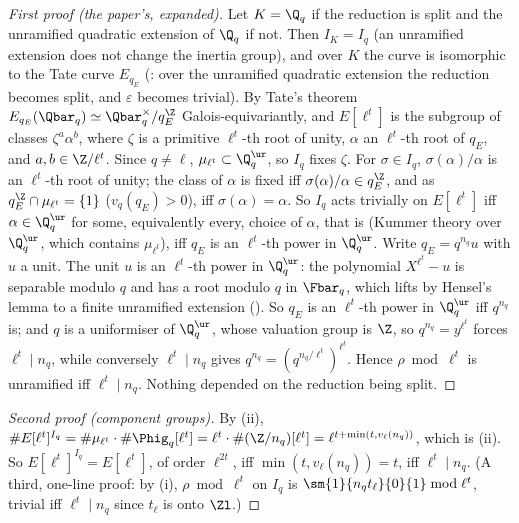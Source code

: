 \begin{proof}[First proof (the paper's, expanded)]
Let $K=\Q_q$ if the reduction is split and the unramified quadratic extension of $\Q_q$ if not. Then $I_K=I_q$ (an unramified extension does not change
the inertia group), and over $K$ the curve is isomorphic to the Tate curve $E_{q_E}$ (: over the unramified quadratic extension
the reduction becomes split, and $\varepsilon$ becomes trivial). By Tate's theorem $E_{q_E}(\Qbar_q)\simeq\Qbar_q^\times/q_E^{\Z}$ Galois-equivariantly, and
$E[\ell^t]$ is the subgroup of classes $\zeta^a\alpha^b$, where $\zeta$ is a primitive $\ell^t$-th root of unity, $\alpha$ an $\ell^t$-th root of $q_E$, and
$a,b\in\Z/\ell^t$. Since $q\ne\ell$, $\mu_{\ell^t}\subset\Q_q^{\ur}$, so $I_q$ fixes $\zeta$. For $\sigma\in I_q$, $\sigma(\alpha)/\alpha$ is an $\ell^t$-th root of unity; the class
of $\alpha$ is fixed iff $\sigma(\alpha)/\alpha\in q_E^{\Z}$, and as $q_E^{\Z}\cap\mu_{\ell^t}=\{1\}$ ($v_q(q_E)>0$), iff $\sigma(\alpha)=\alpha$. So $I_q$ acts trivially on $E[\ell^t]$ iff
$\alpha\in\Q_q^{\ur}$ for some, equivalently every, choice of $\alpha$, that is (Kummer theory over $\Q_q^{\ur}$, which contains $\mu_{\ell^t}$), iff $q_E$ is an
$\ell^t$-th power in $\Q_q^{\ur}$. Write $q_E=q^{n_q}u$ with $u$ a unit. The unit $u$ is an $\ell^t$-th power in $\Q_q^{\ur}$: the polynomial $X^{\ell^t}-u$ is
separable modulo $q$ and has a root modulo $q$ in $\Fbar_q$, which lifts by Hensel's lemma to a finite unramified extension ().
So $q_E$ is an $\ell^t$-th power in $\Q_q^{\ur}$ iff $q^{n_q}$ is; and $q$ is a uniformiser of $\Q_q^{\ur}$, whose valuation group is $\Z$, so $q^{n_q}=y^{\ell^t}$ forces
$\ell^t\mid n_q$, while conversely $\ell^t\mid n_q$ gives $q^{n_q}=(q^{n_q/\ell^t})^{\ell^t}$. Hence $\rho\bmod\ell^t$ is unramified iff $\ell^t\mid n_q$. Nothing depended on
the reduction being split.
\end{proof}

\begin{proof}[Second proof (component groups)]
By (ii), $\#E[\ell^t]^{I_q}=\#\mu_{\ell^t}\cdot\#\Phig_q[\ell^t]=\ell^t\cdot\#(\Z/n_q)[\ell^t]=\ell^{t+\min(t,v_\ell(n_q))}$, which is (ii). So
$E[\ell^t]^{I_q}=E[\ell^t]$, of order $\ell^{2t}$, iff $\min(t,v_\ell(n_q))=t$, iff $\ell^t\mid n_q$. (A third, one-line proof: by (i),
$\rho\bmod\ell^t$ on $I_q$ is $\sm{1}{n_qt_\ell}{0}{1}\bmod\ell^t$, trivial iff $\ell^t\mid n_q$ since $t_\ell$ is onto $\Zl$.)
\end{proof}

